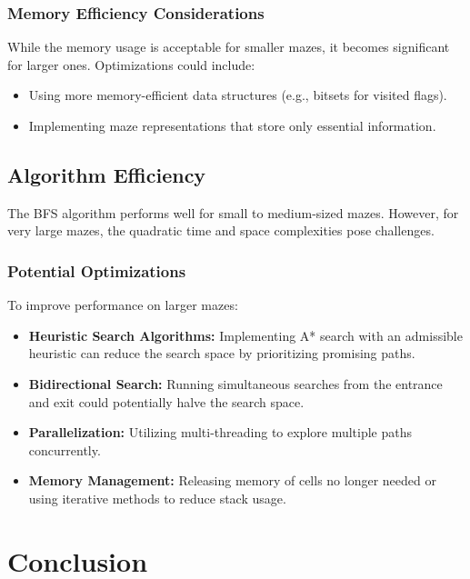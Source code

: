 \documentclass{article}
\begin{document}
\subsubsection*{Memory Efficiency Considerations}

While the memory usage is acceptable for smaller mazes, it becomes significant for larger ones. Optimizations could include:

\begin{itemize}
    \item Using more memory-efficient data structures (e.g., bitsets for visited flags).
    \item Implementing maze representations that store only essential information.
\end{itemize}

\subsection*{Algorithm Efficiency}

The BFS algorithm performs well for small to medium-sized mazes. However, for very large mazes, the quadratic time and space complexities pose challenges.

\subsubsection*{Potential Optimizations}

To improve performance on larger mazes:

\begin{itemize}
    \item \textbf{Heuristic Search Algorithms:} Implementing A* search with an admissible heuristic can reduce the search space by prioritizing promising paths.
    \item \textbf{Bidirectional Search:} Running simultaneous searches from the entrance and exit could potentially halve the search space.
    \item \textbf{Parallelization:} Utilizing multi-threading to explore multiple paths concurrently.
    \item \textbf{Memory Management:} Releasing memory of cells no longer needed or using iterative methods to reduce stack usage.
\end{itemize}

\section*{Conclusion}
\end{document}
